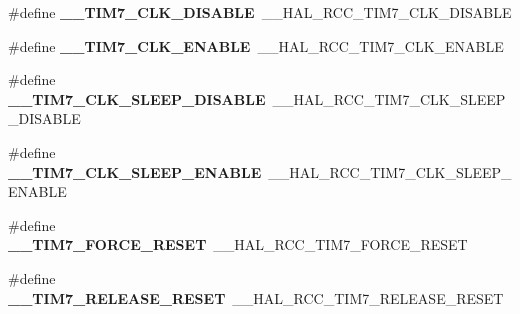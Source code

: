 \begin{DoxyCompactItemize}
\item 
\#define {\bfseries \+\_\+\+\_\+\+T\+I\+M7\+\_\+\+C\+L\+K\+\_\+\+D\+I\+S\+A\+B\+LE}~\+\_\+\+\_\+\+H\+A\+L\+\_\+\+R\+C\+C\+\_\+\+T\+I\+M7\+\_\+\+C\+L\+K\+\_\+\+D\+I\+S\+A\+B\+LE\hypertarget{group___h_a_l___r_c_c___aliased_ga51e8c84a72ecac4490fa36cffd5e05b1}{}\label{group___h_a_l___r_c_c___aliased_ga51e8c84a72ecac4490fa36cffd5e05b1}

\item 
\#define {\bfseries \+\_\+\+\_\+\+T\+I\+M7\+\_\+\+C\+L\+K\+\_\+\+E\+N\+A\+B\+LE}~\+\_\+\+\_\+\+H\+A\+L\+\_\+\+R\+C\+C\+\_\+\+T\+I\+M7\+\_\+\+C\+L\+K\+\_\+\+E\+N\+A\+B\+LE\hypertarget{group___h_a_l___r_c_c___aliased_gabbecf6d3f327c8dbd1047470bb578a0a}{}\label{group___h_a_l___r_c_c___aliased_gabbecf6d3f327c8dbd1047470bb578a0a}

\item 
\#define {\bfseries \+\_\+\+\_\+\+T\+I\+M7\+\_\+\+C\+L\+K\+\_\+\+S\+L\+E\+E\+P\+\_\+\+D\+I\+S\+A\+B\+LE}~\+\_\+\+\_\+\+H\+A\+L\+\_\+\+R\+C\+C\+\_\+\+T\+I\+M7\+\_\+\+C\+L\+K\+\_\+\+S\+L\+E\+E\+P\+\_\+\+D\+I\+S\+A\+B\+LE\hypertarget{group___h_a_l___r_c_c___aliased_ga4c16bf990b994cdc00d0d4802c5d234a}{}\label{group___h_a_l___r_c_c___aliased_ga4c16bf990b994cdc00d0d4802c5d234a}

\item 
\#define {\bfseries \+\_\+\+\_\+\+T\+I\+M7\+\_\+\+C\+L\+K\+\_\+\+S\+L\+E\+E\+P\+\_\+\+E\+N\+A\+B\+LE}~\+\_\+\+\_\+\+H\+A\+L\+\_\+\+R\+C\+C\+\_\+\+T\+I\+M7\+\_\+\+C\+L\+K\+\_\+\+S\+L\+E\+E\+P\+\_\+\+E\+N\+A\+B\+LE\hypertarget{group___h_a_l___r_c_c___aliased_ga96f4fdc9e740dc843f6b31f82441f097}{}\label{group___h_a_l___r_c_c___aliased_ga96f4fdc9e740dc843f6b31f82441f097}

\item 
\#define {\bfseries \+\_\+\+\_\+\+T\+I\+M7\+\_\+\+F\+O\+R\+C\+E\+\_\+\+R\+E\+S\+ET}~\+\_\+\+\_\+\+H\+A\+L\+\_\+\+R\+C\+C\+\_\+\+T\+I\+M7\+\_\+\+F\+O\+R\+C\+E\+\_\+\+R\+E\+S\+ET\hypertarget{group___h_a_l___r_c_c___aliased_ga63998a20f793d6defe0441970e8af993}{}\label{group___h_a_l___r_c_c___aliased_ga63998a20f793d6defe0441970e8af993}

\item 
\#define {\bfseries \+\_\+\+\_\+\+T\+I\+M7\+\_\+\+R\+E\+L\+E\+A\+S\+E\+\_\+\+R\+E\+S\+ET}~\+\_\+\+\_\+\+H\+A\+L\+\_\+\+R\+C\+C\+\_\+\+T\+I\+M7\+\_\+\+R\+E\+L\+E\+A\+S\+E\+\_\+\+R\+E\+S\+ET\hypertarget{group___h_a_l___r_c_c___aliased_ga9bcfc1ba097bb8fbf4edef318cd34fb6}{}\label{group___h_a_l___r_c_c___aliased_ga9bcfc1ba097bb8fbf4edef318cd34fb6}


\end{DoxyCompactItemize}
